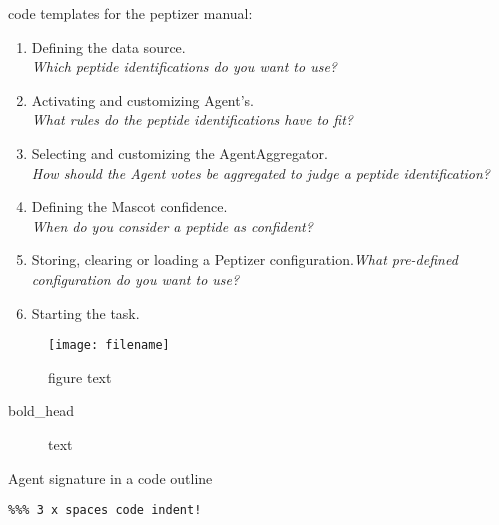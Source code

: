 code templates for the peptizer manual:

\begin{center}
\end{center}


\renewcommand{\labelenumi}{\Alph{enumi}.}
\begin{enumerate}
	\item Defining the data source.\\\textit{Which peptide identifications do you want to use?}
	\item Activating and customizing Agent's.\\\textit{What rules do the peptide identifications have to fit?}
	\item Selecting and customizing the AgentAggregator.\\\textit{How should the Agent votes be aggregated to judge a peptide identification?}
	\item Defining the Mascot confidence.\\\textit{When do you consider a peptide as confident?}
	\item Storing, clearing or loading a Peptizer configuration.\textit{What pre-defined configuration do you want to use?}
	\item Starting the task.
\end{enumerate}


\begin{figure}[h]
\begin{center}
	\texttt{[image: filename]}
	\caption{\label{label_name}figure text}
\end{center}
\end{figure}


\begin{description}
	\item[bold_head] text
\end{description}
%


%
\begin{algorithm}[t!]
\caption{Agent signature in a code outline}
\scriptsize
\vspace{0.3cm}
\begin{verbatim}
%%% 3 x spaces code indent!
\end{verbatim}
\end{algorithm}
%
%